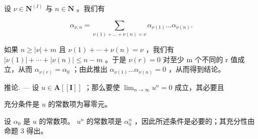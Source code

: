 设 \(\nu \in \mathbf{N}^{(I)}\) 与 \(n\in \mathbf{N}\) 。我们有

\[
\alpha_ {\nu , n} = \sum_ {\nu (1) + \dots + \nu (n) = \nu} \alpha_ {\nu (1)} \dots \alpha_ {\nu (n)}.
\]

如果 \(n \geqslant |\nu| + m\) 且 \(\nu(1) + \cdots + \nu(n) = \nu\) ，我们有 \(|\nu(1)| + \cdots + |\nu(n)| \leqslant n - m\) 。于是 \(\nu(r) = 0\) 对至少 m 个不同的 r 值成立，从而 \(\alpha_{\nu(r)} = \alpha_0\) ；由此推出 \(\alpha_{\nu(1)} \ldots \alpha_{\nu(n)} = 0\) ，从而得到结论。

推论. --- 设 \(u \in \mathbf{A}[[\mathbf{I}]]\) ；那么要使 \(\lim_{n \to \infty} u^n = 0\) 成立，其必要且

充分条件是 \(u\) 的常数项为幂零元。

设 \(\alpha_0\) 是 \(u\) 的常数项。 \(u^n\) 的常数项是 \(\alpha_0^n\) ，因此所述条件是必要的；其充分性由命题 3 得出。
